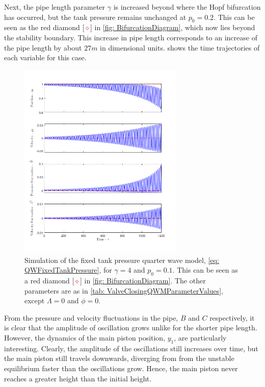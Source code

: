 Next, the pipe length parameter $\gamma$ is increased beyond where the Hopf bifurcation has occurred, but the tank pressure remains unchanged at $p_0 = 0.2$. This can be seen as the red diamond [\textcolor{Red}{$\diamond$}] in \cref{fig: BifurcationDiagram}, which now lies beyond the stability boundary. This increase in pipe length corresponds to an increase of the pipe length by about $27 \si{m}$ in dimensional units.  shows the time trajectories of each variable for this case. 
~
\begin{figure}[ht]
    \centering
    \includegraphics[width=0.7\textwidth]{Figures/CloseToHopf/HopfUnstableLong.png}
    \caption{Simulation of the fixed tank pressure quarter wave model, \cref{eq: QWFixedTankPressure}, for $\gamma = 4$ and $p_0 = 0.1$. This can be seen as a red diamond [\textcolor{Red}{$\diamond$}] in \cref{fig: BifurcationDiagram}. The other parameters are as in \cref{tab: ValveClosingQWMParameterValues}, except $\Lambda=0$ and $\phi=0$.}
    \label{fig: UnstableHopf(Long)}
\end{figure}

From the pressure and velocity fluctuations in the pipe, $B$ and $C$ respectively, it is clear that the amplitude of oscillation grows unlike for the shorter pipe length. However, the dynamics of the main piston position, $y_1$, are particularly interesting. Clearly, the amplitude of the oscillations still increases over time, but the main piston still travels downwards, diverging from from the unstable equilibrium faster than the oscillations grow. Hence, the main piston never reaches a greater height than the initial height.

